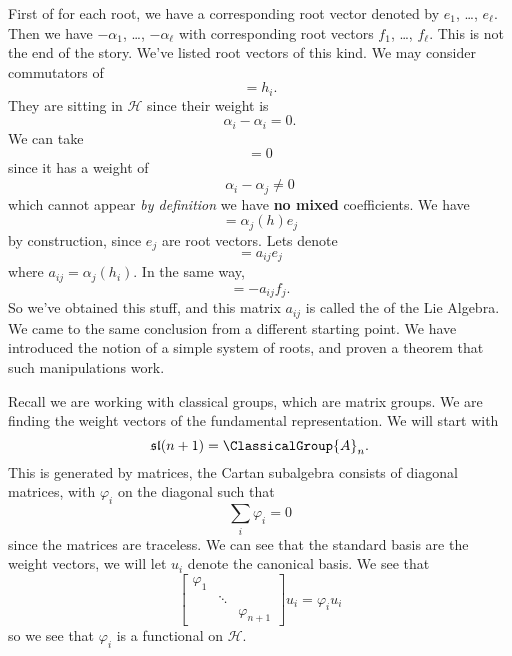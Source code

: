 First of for each root, we have a corresponding root vector
denoted by $e_{1}$, \dots, $e_{\ell}$. Then we have
$-\alpha_{1}$, \dots, $-\alpha_{\ell}$ with corresponding root
vectors $f_{1}$, \dots, $f_{\ell}$. This is not the end of the
story. We've listed root vectors of this kind. We may consider
commutators of
\begin{equation}
[e_{i},f_{i}]=h_{i}.
\end{equation}
They are sitting in $\mathscr{H}$ since their weight is
\begin{equation}
\alpha_{i}-\alpha_{i}=0.
\end{equation}
We can take
\begin{equation}
[e_{i},f_{j}]=0
\end{equation}
since it has a weight of
\begin{equation}
\alpha_{i}-\alpha_{j}\not=0
\end{equation}
which cannot appear \emph{by definition} we have \textbf{no
  mixed} coefficients. We have
\begin{equation}
[h,e_{j}]=\alpha_{j}(h)e_{j}
\end{equation}
by construction, since $e_{j}$ are root vectors. Lets denote
\begin{equation}
[h_{i},e_{j}] = a_{ij}e_{j}
\end{equation}
where $a_{ij}=\alpha_{j}(h_{i})$. In the same way,
\begin{equation}
[h_{i},f_{j}] = -a_{ij}f_{j}.
\end{equation}
So we've obtained this stuff, and this matrix $a_{ij}$ is called
the  of the Lie Algebra. We came to the
same conclusion from a different starting point. We have
introduced the notion of a simple system of roots, and proven a
theorem that such manipulations work.

Recall we are working with classical groups, which are matrix
groups. We are finding the weight vectors of the fundamental
representation. We will start with
\begin{equation}
\mathfrak{sl}(n+1)=\ClassicalGroup{A}_{n}.
\end{equation}
This is generated by matrices, the Cartan subalgebra consists of
diagonal matrices, with $\varphi_{i}$ on the diagonal such that
\begin{equation}
\sum_{i}\varphi_{i}=0
\end{equation}
since the matrices are traceless. We can see that the standard
basis are the weight vectors, we will let $u_{i}$ denote the
canonical basis. We see that
\begin{equation}
\begin{bmatrix}
\varphi_{1} &        &  \\
            & \ddots & \\
            &        & \varphi_{n+1}
\end{bmatrix}
u_{i} = \varphi_{i}u_{i}
\end{equation}
so we see that $\varphi_{i}$ is a functional on $\mathscr{H}$.

